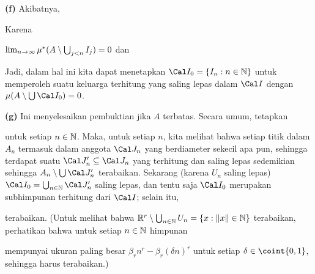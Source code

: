 {{\bf (f)} Akibatnya, 
      
      
\noindent Karena 
      
      
\noindent $\lim_{n\to\infty}\mu\sp*(A\setminus\bigcup_{j<n}I_j)=0$ dan 
      
      
      
Jadi, dalam hal ini kita dapat menetapkan $\Cal I_0=\{I_n:n\in\Bbb N\}$ untuk 
memperoleh suatu keluarga terhitung yang saling lepas dalam $\Cal I$ dengan 
$\mu(A\setminus\bigcup\Cal I_0)=0$. 
      
      
\medskip 
      
{\bf (g)} Ini menyelesaikan pembuktian jika $A$ terbatas. Secara umum, 
tetapkan 
      
      
\noindent untuk setiap $n\in\Bbb N$. Maka, untuk setiap $n$, kita melihat 
bahwa setiap titik dalam $A_n$ termasuk dalam anggota $\Cal J_n$ yang berdiameter 
sekecil apa pun, sehingga terdapat suatu $\Cal J'_n\subseteq\Cal J_n$ yang terhitung 
dan saling lepas sedemikian sehingga 
$A_n\setminus\bigcup\Cal J'_n$ terabaikan. Sekarang (karena $U_n$ saling 
lepas) $\Cal I_0=\bigcup_{n\in\Bbb N}\Cal J'_n$ saling lepas, dan tentu saja 
$\Cal I_0$ merupakan subhimpunan terhitung dari $\Cal I$; selain itu, 
      
      
\noindent terabaikan. (Untuk melihat bahwa $\Bbb 
R^r\setminus\bigcup_{n\in\Bbb N}U_n=\{x:\|x\|\in\Bbb N\}$ terabaikan, 
perhatikan bahwa untuk setiap $n\in\Bbb N$ himpunan 
      
      
\noindent mempunyai ukuran paling besar $\beta_rn^r-\beta_r(\delta n)^r$ 
untuk setiap $\delta\in\coint{0,1}$, sehingga harus terabaikan.) 
}%
      
